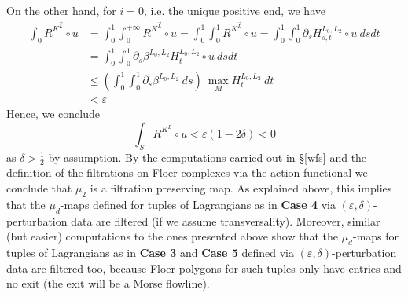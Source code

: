 	\noindent On the other hand, for $i=0$, i.e. the unique positive end, we have
	\begin{align*} \int_0 R^{K^{\vec{L}}}\circ u &= 
		\int_0^1\int_0^{+\infty} R^{K^{\vec{L}}}\circ u = \int_0^1\int_{0}^1 R^{K^{\vec{L}}}\circ u = \int_0^1\int_{0}^1 \partial_s \overline{H^{L_0,L_2}_{s,t}}\circ u\ dsdt \\ & = \int_0^1\int_{0}^1 \partial_s\beta^{L_0,L_2}H^{L_0,L_2}_t\circ u \ ds dt \\ & \leq 
		\left(\int_0^1\int_0^1\partial_s\beta^{L_0,L_2}\ ds \right)\ \max_MH^{L_0,L_2}_t\ dt\\ & < \varepsilon
	\end{align*}
	Hence, we conclude $$\int_SR^{K^{\vec{L}}}\circ u<\varepsilon(1-2\delta)<0$$ as $\delta>\frac{1}{2}$ by assumption. By the computations carried out in \S \ref{wfs} and the definition of the filtrations on Floer complexes via the action functional we conclude that $\mu_2$ is a filtration preserving map. As explained above, this implies that the $\mu_d$-maps defined for tuples of Lagrangians as in \textbf{Case 4} via $(\varepsilon,\delta)$-perturbation data are filtered (if we assume transversality). Moreover, similar (but easier) computations to the ones presented above show that the $\mu_d$-maps for tuples of Lagrangians as in \textbf{Case 3} and \textbf{Case 5} defined via $(\varepsilon,\delta)$-perturbation data are filtered too, because Floer polygons for such tuples only have entries and no exit (the exit will be a Morse flowline).
	
